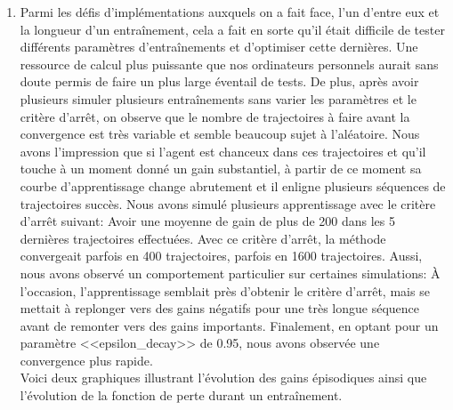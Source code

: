 \documentclass[letterpaper,11pt]{article}
\begin{document}
\begin{enumerate}[label=(\alph*)]
\item Parmi les défis d'implémentations auxquels on a fait face, l'un d'entre eux et la longueur d'un entraînement, cela a fait en sorte qu'il était difficile de tester différents paramètres d'entraînements et d'optimiser cette dernières. Une ressource de calcul plus puissante que nos ordinateurs personnels aurait sans doute permis de faire un plus large éventail de tests. De plus, après avoir plusieurs simuler plusieurs entraînements sans varier les paramètres et le critère d'arrêt, on observe que le nombre de trajectoires à faire avant la convergence est très variable et semble beaucoup sujet à l'aléatoire. Nous avons l'impression que si l'agent est chanceux dans ces trajectoires et qu'il touche à un moment donné un gain substantiel, à partir de ce moment sa courbe d'apprentissage change abrutement et il enligne plusieurs séquences de trajectoires succès. Nous avons simulé plusieurs apprentissage avec le critère d'arrêt suivant: Avoir une moyenne de gain de plus de 200 dans les 5 dernières trajectoires effectuées. Avec ce critère d'arrêt, la méthode convergeait parfois en 400 trajectoires, parfois en 1600 trajectoires. Aussi, nous avons observé un comportement particulier sur certaines simulations: À l'occasion, l'apprentissage semblait près d'obtenir le critère d'arrêt, mais se mettait à replonger vers des gains négatifs pour une très longue séquence avant de remonter vers des gains importants. Finalement, en optant pour un paramètre <<epsilon\_decay>> de 0.95, nous avons observée une convergence plus rapide.\\

Voici deux graphiques illustrant l'évolution des gains épisodiques ainsi que l'évolution de la fonction de perte durant un entraînement.


\end{enumerate}
\end{document}
